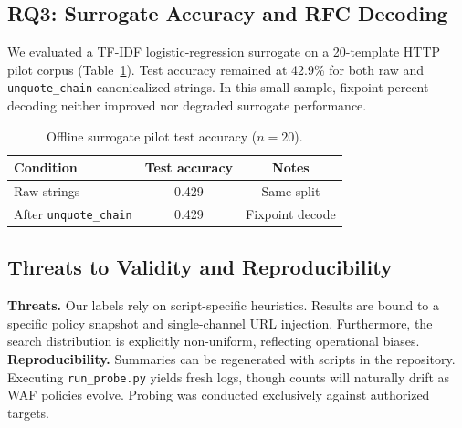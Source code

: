 \subsection{RQ3: Surrogate Accuracy and RFC Decoding}
We evaluated a TF-IDF logistic-regression surrogate on a 20-template HTTP pilot corpus (Table~\ref{tab:bypass_rates}). Test accuracy remained at 42.9\% for both raw and \texttt{unquote\_chain}-canonicalized strings. In this small sample, fixpoint percent-decoding neither improved nor degraded surrogate performance.

\begin{table}[h]
  \centering
  \caption{Offline surrogate pilot test accuracy ($n{=}20$).}
  \label{tab:bypass_rates}
  \begin{tabular}{lcc}
    \toprule
    Condition & Test accuracy & Notes \\
    \midrule
    Raw strings & 0.429 & Same split \\
    After \texttt{unquote\_chain} & 0.429 & Fixpoint decode \\
    \bottomrule
  \end{tabular}
\end{table}

\subsection{Threats to Validity and Reproducibility}
\textbf{Threats.} Our labels rely on script-specific heuristics. Results are bound to a specific policy snapshot and single-channel URL injection. Furthermore, the search distribution is explicitly non-uniform, reflecting operational biases. 
\textbf{Reproducibility.} Summaries can be regenerated with scripts in the repository. Executing \texttt{run\_probe.py} yields fresh logs, though counts will naturally drift as WAF policies evolve. Probing was conducted exclusively against authorized targets.
